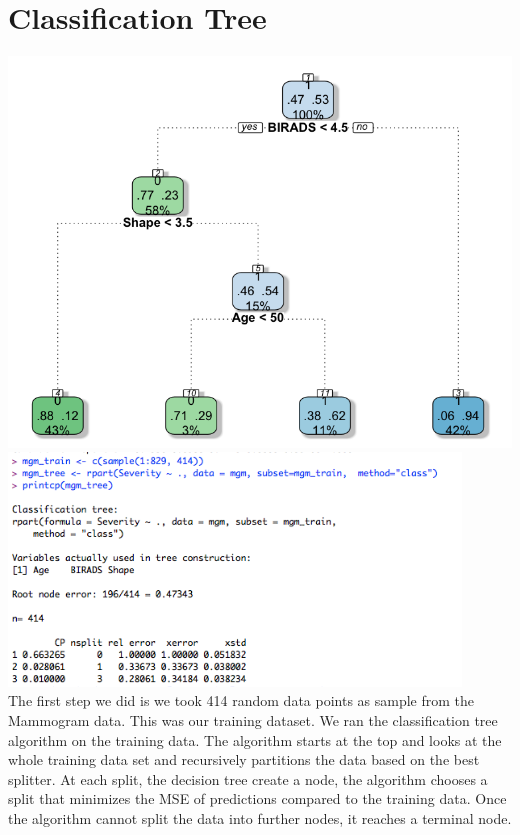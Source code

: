 \documentclass[a4paper, 12pt, one column, aas_macros]{article}
\begin{document}
\section{Classification Tree}


\includegraphics[width=\textwidth]{Classification_Tree2.png}
\includegraphics[width=12cm]{Classification_Tree.png}
\\	The first step we did is we took 414 random data points as sample from the Mammogram data. This was our training dataset. We ran the classification tree algorithm on the training data.
The algorithm starts at the top and looks at the whole training data set and recursively partitions the data based on the best splitter. At each split, the decision tree create a node, the algorithm chooses a split that minimizes the MSE of predictions compared to the training data. Once the algorithm cannot split the data into further nodes, it reaches a terminal node.
\end{document}
